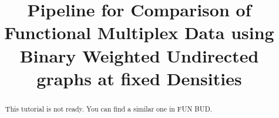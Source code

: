 \documentclass[justified]{tufte-handout}
\title{Pipeline for Comparison of Functional Multiplex Data using Binary Weighted Undirected graphs at fixed Densities}
\begin{document}
\maketitle

\begin{abstract}
\noindent
This tutorial is not ready. You can find a similar one in FUN BUD.
\end{abstract}
\end{document}
